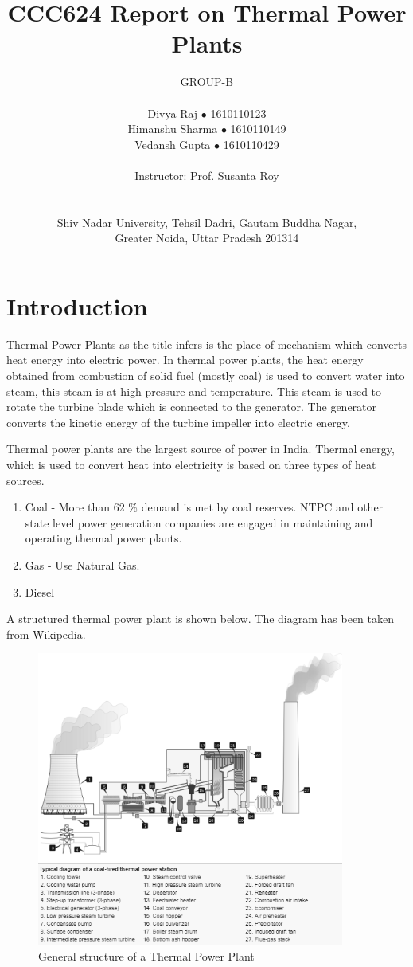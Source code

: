 \documentclass{report}
\title{\textbf{\Huge CCC624 Report on Thermal Power Plants}}
\author{GROUP-B \\\\ Divya Raj $\bullet$ 1610110123 \\ Himanshu Sharma $\bullet$ 1610110149 \\ Vedansh Gupta $\bullet$ 1610110429 \\\\ Instructor: Prof. Susanta Roy \\\\\\ Shiv Nadar University, Tehsil Dadri, Gautam Buddha Nagar, \\Greater Noida, Uttar Pradesh 201314}
\date{}
\begin{document}
\maketitle
\tableofcontents
\newpage
\renewcommand{\thesection}{\arabic{section}}
\section{Introduction}
Thermal Power Plants as the title infers is the place of mechanism which converts heat energy into electric power. In thermal power plants, the heat energy obtained from combustion of solid fuel (mostly coal) is used to convert water into steam, this steam is at high pressure and temperature. This steam is used to rotate the turbine blade which is connected to the generator. The generator converts the kinetic energy of the turbine impeller into electric energy.
\par Thermal power plants are the largest source of power in India. Thermal energy, which is used to convert heat into electricity is based on three types of heat sources.
\begin{enumerate}
\item{Coal - More than 62 \% demand is met by coal reserves. NTPC and other state level power generation companies are engaged in maintaining and operating thermal power plants.}
\item{Gas - Use Natural Gas.}
\item{Diesel}
\end{enumerate}
A structured thermal power plant is shown below. The diagram has been taken from Wikipedia.

\begin{figure}[H]
\centering \includegraphics[width=0.9\textwidth]{images/tpp1.png}
\caption{General structure of a Thermal Power Plant}
\end{figure}
\end{document}
